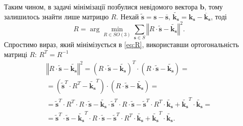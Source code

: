 Таким чином, в задачі мінімізації позбулися невідомого вектора $\boldsymbol{b}$,
тому залишилось знайти лише матрицю $R$.
Нехай $\tilde{\boldsymbol{s}} = \boldsymbol{s} - \overline{\boldsymbol{s}}, \,
  \tilde{\boldsymbol{k_s}} = \boldsymbol{k_s} - \overline{\boldsymbol{k}}_{\boldsymbol{s}}$,
тоді
\begin{equation}\label{eq:R}
  R =
  \arg \min \limits_{R \in SO \left( 3 \right) }
    \sum \limits_{\boldsymbol{s} \in S}
      \left \Vert R \cdot \tilde{\boldsymbol{s}} - \tilde{\boldsymbol{k_s}} \right \Vert^2.
\end{equation}
Спростимо вираз, який мінімізується в \eqref{eq:R},
використавши ортогональність матриці $R$: $R^T = R^{-1}$
\begin{equation*}
  \begin{gathered}
    \left \Vert R \cdot \tilde{\boldsymbol{s}} - \tilde{\boldsymbol{k_s}} \right \Vert^2 =
    \left( R \cdot \tilde{\boldsymbol{s}} - \tilde{\boldsymbol{k_s}} \right)^T \cdot
    \left( R \cdot \tilde{\boldsymbol{s}} - \tilde{\boldsymbol{k_s}} \right) = \\
    = \left( \tilde{\boldsymbol{s}}^T \cdot R^T - \tilde{\boldsymbol{k_s}}^T \right) \cdot
    \left( R \cdot \tilde{\boldsymbol{s}} - \tilde{\boldsymbol{k_s}} \right) = \\
    = \tilde{\boldsymbol{s}}^T \cdot R^T \cdot R \cdot \tilde{\boldsymbol{s}} -
    \tilde{\boldsymbol{k_s}} \cdot \tilde{\boldsymbol{s}}^T \cdot R \cdot \tilde{\boldsymbol{s}} -
    \tilde{\boldsymbol{s}}^T \cdot R^T \cdot
    \tilde{\boldsymbol{k_s}} + \tilde{\boldsymbol{k_s}}^T \cdot \tilde{\boldsymbol{k_s}} = \\
    = \tilde{\boldsymbol{s}}^T \cdot \tilde{\boldsymbol{s}} -
    \tilde{\boldsymbol{k_s}}^T \cdot R \cdot \tilde{\boldsymbol{s}} -
    \tilde{\boldsymbol{s}}^T \cdot R^T \cdot \tilde{\boldsymbol{k_s}} +
    \tilde{\boldsymbol{k_s}}^T \cdot \tilde{\boldsymbol{k_s}}.
  \end{gathered}
\end{equation*}

